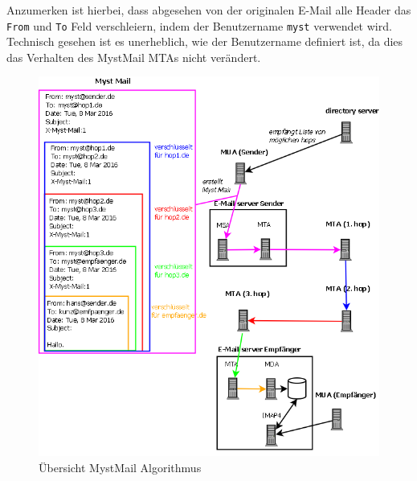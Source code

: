 Anzumerken ist hierbei, dass abgesehen von der originalen E-Mail alle Header das \verb#From# und \verb#To# Feld verschleiern, indem der Benutzername \verb#myst# verwendet wird. Technisch gesehen ist es unerheblich, wie der Benutzername definiert ist, da dies das Verhalten des MystMail MTAs nicht verändert.

\begin{figure}[htb]
	\centering
	\includegraphics[scale=0.5]{Content/Entwicklung/IdeaConcept/Algorithmus.png}
	\caption{Übersicht MystMail Algorithmus}
	\label{fig:algorithmus}
\end{figure}
\vfill
\clearpage